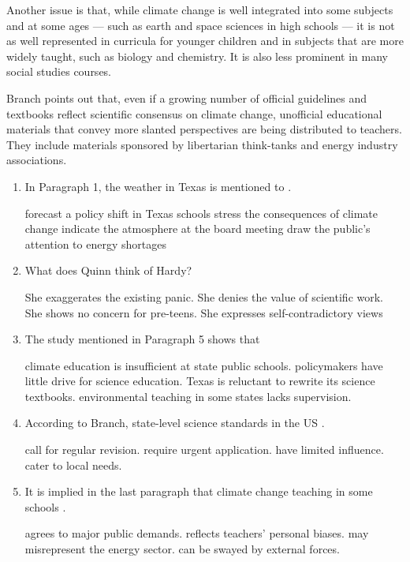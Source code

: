 Another issue is that, while climate change is well integrated into some subjects and at some ages — such as earth and space sciences in high schools — it is not as well represented in curricula for younger children and in subjects that are more widely taught, such as biology and chemistry. It is also less prominent in many social studies courses.

Branch points out that, even if a growing number of official guidelines and textbooks reflect scientific consensus on climate change, unofficial educational materials that convey more slanted perspectives are being distributed to teachers. They include materials sponsored by libertarian think-tanks and energy industry associations.


\begin{enumerate}[resume]

\item

In Paragraph 1, the weather in Texas is mentioned to \lineread.

\fourchoices
{forecast a policy shift in Texas schools}
{stress the consequences of climate change}
{indicate the atmosphere at the board meeting}
{draw the public's attention to energy shortages}


\item

What does Quinn think of Hardy?

\fourchoices
{She exaggerates the existing panic.}
{She denies the value of scientific work.}
{She shows no concern for pre-teens.}
{She expresses self-contradictory views}

\item

The study mentioned in Paragraph 5 shows that \lineread

\fourchoices
{climate education is insufficient at state public schools.}
{policymakers have little drive for science education.}
{Texas is reluctant to rewrite its science textbooks.}
{environmental teaching in some states lacks supervision.}

\item

According to Branch, state-level science standards in the US \lineread.

\fourchoices
{call for regular revision.}
{require urgent application.}
{have limited influence.}
{cater to local needs.}

\item

It is implied in the last paragraph that climate change teaching in some schools \lineread.

\fourchoices
{agrees to major public demands.}
{reflects teachers' personal biases.}
{may misrepresent the energy sector.}
{can be swayed by external forces.}

\end{enumerate}


